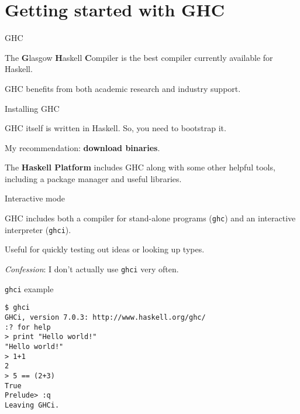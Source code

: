 
\section{Getting started with GHC}

%
\begin{frame}{GHC}

The \textbf{G}lasgow \textbf{H}askell \textbf{C}ompiler is the best compiler
currently available for Haskell.

GHC benefits from both academic research and industry support.

\end{frame}

%
\begin{frame}{Installing GHC}

GHC itself is written in Haskell. So, you need to bootstrap it.

My recommendation: \textbf{download binaries}.

The \textbf{Haskell Platform} includes GHC along with some other helpful tools,
including a package manager and useful libraries.


\end{frame}

%
\begin{frame}{Interactive mode}

GHC includes both a compiler for stand-alone programs (\texttt{ghc}) and an
interactive interpreter (\texttt{ghci}).

Useful for quickly testing out ideas or looking up types.

\emph{Confession}: I don't actually use \texttt{ghci} very often.

\end{frame}

%
\begin{frame}[fragile]{\texttt{ghci} example}

\begin{block}{}
\begin{verbatim}
$ ghci
GHCi, version 7.0.3: http://www.haskell.org/ghc/
:? for help
> print "Hello world!"
"Hello world!"
> 1+1
2
> 5 == (2+3)
True
Prelude> :q
Leaving GHCi.
\end{verbatim}
\end{block}

\end{frame}

